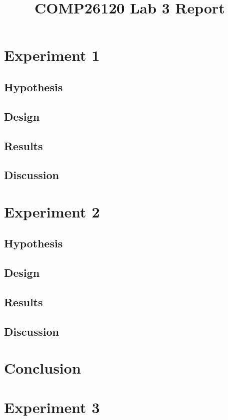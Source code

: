 \documentclass[a4]{article}
\title{COMP26120 Lab 3 Report}
\author{}
\begin{document}
\maketitle

\section{Experiment 1}

\subsection{Hypothesis}

\subsection{Design}

\subsection{Results}

\subsection{Discussion}

\section{Experiment 2}

\subsection{Hypothesis}

\subsection{Design}

\subsection{Results}

\subsection{Discussion}

\section{Conclusion}

\section{Experiment 3}

\appendix

\end{document}
